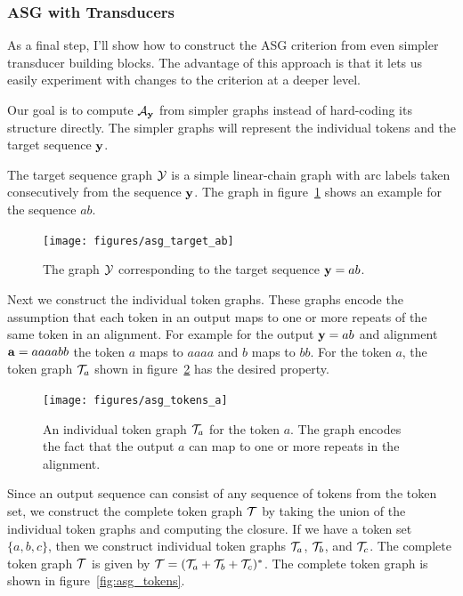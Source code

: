 \subsubsection{ASG with Transducers}

As a final step, I'll show how to construct the ASG criterion from even simpler
transducer building blocks. The advantage of this approach is that it lets us
easily experiment with changes to the criterion at a deeper level.

Our goal is to compute $\mathcal{A}_{\bf y}$ from simpler graphs instead of hard-coding its
structure directly. The simpler graphs will represent the individual tokens and
the target sequence ${\bf y}$.

The target sequence graph $\mathcal{Y}$ is a simple linear-chain graph with arc labels
taken consecutively from the sequence ${\bf y}$. The graph in
figure~\ref{fig:asg_target_ab} shows an example for the sequence $ab$.

\begin{figure}
    \centering
    \texttt{[image: figures/asg\_target\_ab]}
    \caption{The graph $\mathcal{Y}$ corresponding to the target sequence ${\bf y} = ab$.}
    \label{fig:asg_target_ab}
\end{figure}

Next we construct the individual token graphs. These graphs encode the
assumption that each token in an output maps to one or more repeats of the same
token in an alignment. For example for the output ${\bf y} = ab$ and alignment ${\bf a}
= aaaabb$ the token $a$ maps to $aaaa$ and $b$ maps to  $bb$. For the token
$a$, the token graph $\mathcal{T}_a$ shown in figure~\ref{fig:asg_tokens_a} has the
desired property.

\begin{figure}
    \centering
    \texttt{[image: figures/asg\_tokens\_a]}
    \caption{An individual token graph $\mathcal{T}_a$ for the token $a$. The graph
    encodes the fact that the output $a$ can map to one or more repeats in the
    alignment.}
    \label{fig:asg_tokens_a}
\end{figure}

Since an output sequence can consist of any sequence of tokens from the token
set, we construct the complete token graph $\mathcal{T}$ by taking the union of the
individual token graphs and computing the closure. If we have a token set $\{a,
b, c\}$, then we construct individual token graphs $\mathcal{T}_a$, $\mathcal{T}_b$, and
$\mathcal{T}_c$. The complete token graph $\mathcal{T}$ is given by $\mathcal{T} = (\mathcal{T}_a + \mathcal{T}_b +
\mathcal{T}_c)^*$. The complete token graph is shown in figure~\ref{fig:asg_tokens}.

